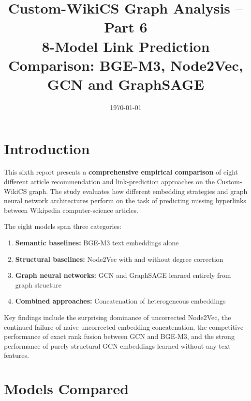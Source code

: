 \documentclass[12pt,a4paper]{article}
\title{Custom-WikiCS Graph Analysis -- Part 6\\[4pt]
\large 8-Model Link Prediction Comparison: BGE-M3, Node2Vec, GCN and GraphSAGE}
\author{}
\date{\today}
\begin{document}
\maketitle

\section{Introduction}

This sixth report presents a \textbf{comprehensive empirical comparison} of eight
different article recommendation and link-prediction approaches on the Custom-WikiCS
graph.  The study evaluates how different embedding strategies and graph neural
network architectures perform on the task of predicting missing hyperlinks between
Wikipedia computer-science articles.

The eight models span three categories:
\begin{enumerate}
    \item \textbf{Semantic baselines:} BGE-M3 text embeddings alone
    \item \textbf{Structural baselines:} Node2Vec with and without degree correction
    \item \textbf{Graph neural networks:} GCN and GraphSAGE learned entirely from graph structure
    \item \textbf{Combined approaches:} Concatenation of heterogeneous embeddings
\end{enumerate}

Key findings include the surprising dominance of uncorrected Node2Vec, the
continued failure of naive uncorrected embedding concatenation, the competitive
performance of exact rank fusion between GCN and BGE-M3, and the strong
performance of purely structural GCN embeddings learned without any text features.

\section{Models Compared}
\end{document}
